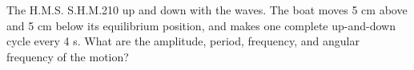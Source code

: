 \documentclass[a4paper, openany, solutions, FlipAns]{TsangPS}
\date{Due: 15 Oct 2018}%
\begin{document}
\maketitle

\begin{question}{The H.M.S. S.H.M.}{2}{1}{0}
 up and down with the waves. The boat moves 5 cm above and 5 cm below its equilibrium position, and makes one complete up-and-down cycle every 4 s. What are the amplitude, period, frequency, and angular frequency of the motion?

\end{question}

\makeline
\end{document}
